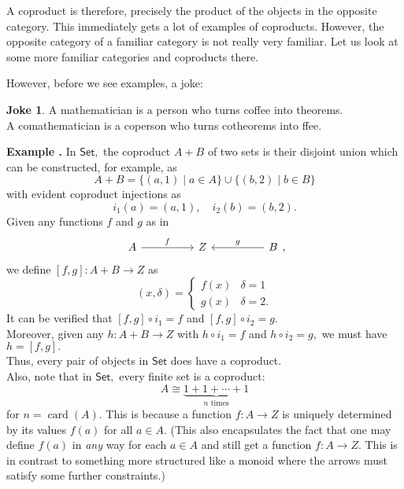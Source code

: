 \documentclass[11pt,leqno,landscape,semhelv]{seminar}
\theoremstyle{definition}
\newtheorem{joke}{Joke}
\numberwithin{joke}{section}
\numberwithin{thm}{section}
\numberwithin{equation}{section}
\newcommand{\example}[1]{\refstepcounter{thm}\par\medskip
   {\textbf{Example \thethm.} #1} \rmfamily}
\begin{document}
A coproduct is therefore, precisely the product of the objects in the opposite category. This immediately gets a lot of examples of coproducts. However, the opposite category of a familiar category is not really very familiar. Let us look at some more familiar categories and coproducts there.

\hrulefill

However, before we see examples, a joke:
\begin{joke}
A mathematician is a person who turns coffee into theorems.\\
A comathematician is a coperson who turns cotheorems into ffee.
\end{joke}
\hrulefill

\example{}  In $\mathsf{Set},$ the coproduct $A+B$ of two sets is their disjoint union which can be constructed, for example, as
\begin{equation*} 
  A + B = \{(a, 1) \mid a \in A\} \cup \{(b, 2) \mid b \in B\}
\end{equation*}
with evident coproduct injections as
\begin{equation*} 
  i_1(a) = (a, 1), \quad i_2(b) = (b, 2).
\end{equation*}
Given any functions $f$ and $g$ as in
\begin{equation*} 
  \begin{tikzcd}
    A \arrow[rr, "f"] && Z && B \arrow[ll, "g"']
  \end{tikzcd},
\end{equation*}
we define $[f, g]:A+B \to Z$ as
\begin{equation*} 
  [f, g](x, \delta) = \begin{cases}
    f(x) & \delta = 1\\
    g(x) & \delta = 2.
  \end{cases}
\end{equation*}
It can be verified that $[f, g]\circ i_1 = f$ and $[f, g]\circ i_2 = g.$\\
Moreover, given any $h:A+B \to Z$ with $h\circ i_1 = f$ and $h\circ i_2 = g,$ we must have $h = [f, g].$\\
Thus, every pair of objects in $\mathsf{Set}$ does have a coproduct.\\
Also, note that in $\mathsf{Set},$ every finite set is a coproduct:
\begin{equation*} 
  A \cong \underbrace{1 + 1 + \cdots + 1}_{n \text{ times}}
\end{equation*}
for $n = \operatorname{card}(A).$ This is because a function $f:A \to Z$ is uniquely determined by its values $f(a)$ for all $a \in A.$ (This also encapsulates the fact that one may define $f(a)$ in \emph{any} way for each $a \in A$ and still get a function $f:A\to Z.$ This is in contrast to something more structured like a monoid where the arrows must satisfy some further constraints.)
\end{document}
